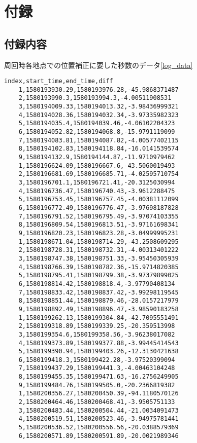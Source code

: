 \appendix
\chapter{付録}

\section{付録内容}
周回時各地点での位置補正に要した秒数のデータ\ref{log_data}
\begin{lstlisting}[caption=log\_data.csv,label=log_data]
    index,start_time,end_time,diff
    1,1580193930.29,1580193976.28,-45.9868371487
    2,1580193990.3,1580193994.3,-4.00511908531
    3,1580194009.33,1580194013.32,-3.98436999321
    4,1580194028.36,1580194032.34,-3.97335982323
    5,1580194035.4,1580194039.46,-4.06102204323
    6,1580194052.82,1580194068.8,-15.9791119099
    7,1580194083.81,1580194087.82,-4.00577402115
    8,1580194102.83,1580194118.84,-16.0141539574
    9,1580194132.9,1580194144.87,-11.9710979462
    1,1580196624.09,1580196667.6,-43.5060019493
    2,1580196681.69,1580196685.71,-4.02595710754
    3,1580196701.1,1580196721.41,-20.3125030994
    4,1580196736.47,1580196740.43,-3.9612288475
    5,1580196753.45,1580196757.45,-4.00381112099
    6,1580196772.49,1580196776.47,-3.97698187828
    7,1580196791.52,1580196795.49,-3.97074103355
    8,1580196809.54,1580196813.51,-3.97161698341
    9,1580196820.23,1580196823.28,-3.04999995231
    1,1580198671.04,1580198714.29,-43.2508609295
    2,1580198728.31,1580198732.31,-4.00313401222
    3,1580198747.38,1580198751.33,-3.95450305939
    4,1580198766.39,1580198782.36,-15.9714820385
    5,1580198795.41,1580198799.38,-3.97379899025
    6,1580198814.42,1580198818.4,-3.97790408134
    7,1580198833.42,1580198837.42,-3.99298119545
    8,1580198851.44,1580198879.46,-28.0157217979
    9,1580198892.49,1580198896.47,-3.98590183258
    1,1580199262.13,1580199304.84,-42.7095551491
    2,1580199318.89,1580199339.25,-20.359513998
    3,1580199354.6,1580199358.56,-3.96238017082
    4,1580199373.89,1580199377.88,-3.99445414543
    5,1580199390.94,1580199403.26,-12.3130421638
    6,1580199418.3,1580199422.28,-3.97520399094
    7,1580199437.29,1580199441.3,-4.00463104248
    8,1580199455.35,1580199471.63,-16.2756249905
    9,1580199484.76,1580199505.0,-20.2366819382
    1,1580200356.27,1580200450.39,-94.1180570126
    2,1580200464.46,1580200468.41,-3.9505751133
    3,1580200483.44,1580200504.44,-21.0034091473
    4,1580200519.51,1580200523.46,-3.94975781441
    5,1580200536.52,1580200556.56,-20.0388579369
    6,1580200571.89,1580200591.89,-20.0021989346

\end{lstlisting}

